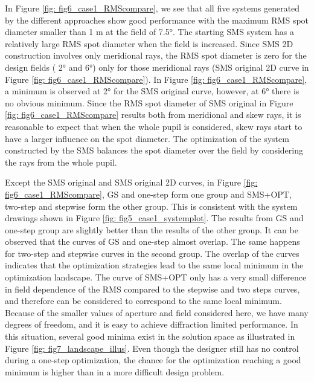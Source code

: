 In Figure \ref{fig: fig6_case1_RMScompare}, we see that all five systems generated by the different approaches show good performance with the maximum RMS spot diameter smaller than 1 \textmu m at the field of 7.5°. The starting SMS system has a relatively large RMS spot diameter when the field is increased. Since SMS 2D construction involves only meridional rays, the RMS spot diameter is zero for the design fields ( 2° and 6°) only for those meridional rays (SMS original 2D curve in Figure \ref{fig: fig6_case1_RMScompare}). In Figure \ref{fig: fig6_case1_RMScompare}, a minimum is observed at 2° for the SMS original curve, however, at 6° there is no obvious minimum. Since the RMS spot diameter of SMS original in Figure \ref{fig: fig6_case1_RMScompare} results both from meridional and skew rays, it is reasonable to expect that when the whole pupil is considered, skew rays start to have a larger influence on the spot diameter. The optimization of the system constructed by the SMS balances the spot diameter over the field by considering the rays from the whole pupil. 

Except the SMS original and SMS original 2D curves, in Figure \ref{fig: fig6_case1_RMScompare}, GS and one-step form one group and SMS+OPT, two-step and stepwise form the other group. This is consistent with the system drawings shown in Figure \ref{fig: fig5_case1_systemplot}. The results from GS and one-step group are slightly better than the results of the other group.  It can be observed that the curves of GS and one-step almost overlap. The same happens for two-step and stepwise curves in the second group. The overlap of the curves indicates that the optimization strategies lead to the same local minimum in the optimization landscape. The curve of SMS+OPT only has a very small difference in field dependence of the RMS compared to the stepwise and two steps curves, and therefore can be considered to correspond to the same local minimum. Because of the smaller values of aperture and field considered here, we have many degrees of freedom, and it is easy to achieve diffraction limited performance. In this situation, several good minima exist in the solution space as illustrated in Figure \ref{fig: fig7_landscape_illus}. Even though the designer still has no control during a one-step optimization, the chance for the optimization reaching a good minimum is higher than in a more difficult design problem.

